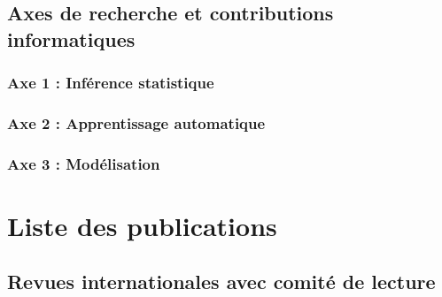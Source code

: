 \documentclass[11pt,a4paper]{article}
\begin{document}
\subsection{Axes de recherche et contributions informatiques}

\subsubsection{Axe 1 : Inférence statistique}

\subsubsection{Axe 2 : Apprentissage automatique}

\subsubsection{Axe 3 : Modélisation}





\section{Liste des publications}

\subsection{Revues internationales avec comité de lecture}
\end{document}
